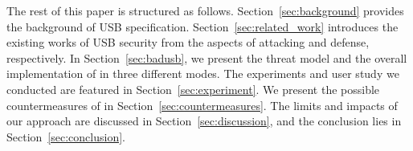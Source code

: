 The rest of this paper is structured as follows.  Section~\ref{sec:background}
provides the background of \ac{USB} specification.  Section~\ref{sec:related_work}
introduces the existing works of \ac{USB} security from the aspects of attacking and
defense, respectively.  In Section~\ref{sec:badusb}, we present the threat model
and the overall implementation of \tool in three different modes.  The
experiments and user study we conducted are featured in
Section~\ref{sec:experiment}.  We present the possible countermeasures of \tool
in Section~\ref{sec:countermeasures}.  The limits and impacts of our approach
are discussed in Section~\ref{sec:discussion}, and the conclusion lies in
Section~\ref{sec:conclusion}.














